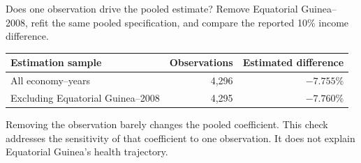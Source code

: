 \begin{frame}{Does one observation drive the pooled estimate?}
  Remove Equatorial Guinea--2008, refit the same pooled specification, and
  compare the reported 10\% income difference.

  \vspace{0.6em}
  \renewcommand{\arraystretch}{1.4}
  \begin{tabularx}{\textwidth}{@{}>{\RaggedRight\arraybackslash}Xrr@{}}
    \toprule
    \textbf{Estimation sample} & \textbf{Observations} & \textbf{Estimated difference} \\
    \midrule
    All economy--years & 4,296 & $-7.755\%$ \\
    Excluding Equatorial Guinea--2008 & 4,295 & $-7.760\%$ \\
    \bottomrule
  \end{tabularx}

  \vspace{0.8em}
  Removing the observation barely changes the pooled coefficient. This check
  addresses the sensitivity of that coefficient to one observation. It does
  not explain Equatorial Guinea's health trajectory.
\end{frame}
